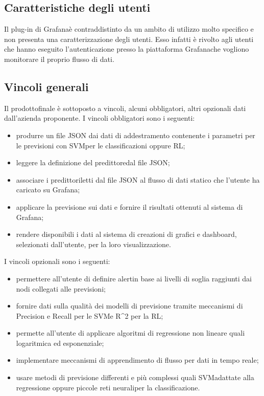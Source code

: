 	\subsection{Caratteristiche degli utenti}
	Il plug-in di Grafana\glosp è contraddistinto da un ambito di utilizzo molto specifico e non presenta una caratterizzazione degli utenti. Esso infatti è rivolto agli utenti che hanno eseguito l'autenticazione presso la piattaforma Grafana\glosp che vogliono monitorare il proprio flusso di dati.
	\subsection{Vincoli generali}
	Il prodotto\glosp finale è sottoposto a vincoli, alcuni obbligatori, altri opzionali dati dall'azienda proponente.
	I vincoli obbligatori sono i seguenti:
	\begin{itemize}
		\item produrre un file JSON dai dati di addestramento contenente i parametri per le previsioni con SVM\glosp per le classificazioni oppure RL\glo;
		\item leggere la definizione del predittore\glosp dal file JSON;
		\item associare i predittori\glosp letti dal file JSON al flusso di dati statico che l'utente ha caricato su Grafana\glo;
		\item applicare la previsione sui dati e fornire il risultati ottenuti al sistema di Grafana\glo;
		\item rendere disponibili i dati al sistema di creazioni di grafici e dashboard\glo, selezionati dall'utente, per la loro visualizzazione.
	\end{itemize}
	I vincoli opzionali sono i seguenti:
	\begin{itemize}
		\item permettere all'utente di definire alert\glosp in base ai livelli di soglia raggiunti dai nodi collegati alle previsioni;
		\item fornire dati sulla qualità dei modelli di previsione tramite meccanismi di Precision e Recall per le SVM\glosp e R\^{}2 per la RL\glo;
		\item permette all'utente di applicare algoritmi di regressione non lineare quali logaritmica ed esponenziale;
		\item implementare meccanismi di apprendimento di flusso per dati in tempo reale;
		\item usare metodi di previsione differenti e più complessi quali SVM\glosp adattate alla regressione oppure piccole reti neurali\glosp per la classificazione.
	\end{itemize}
